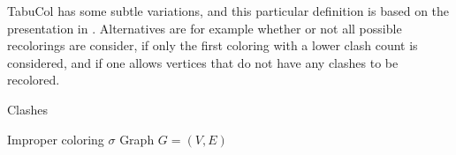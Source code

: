 \documentclass[a4paper]{article}
\begin{document}
TabuCol has some subtle variations, and this particular definition is based on
the presentation in \cite{Constructive}. Alternatives are for example whether or
not all possible recolorings are consider, if only the first coloring with a
lower clash count is considered, and if one allows vertices that do not have any
clashes to be recolored.

\begin{algorithm}[H]
    \caption{Clashes}
    \begin{algorithmic}[1]
        \REQUIRE Improper coloring $\sigma$
        \REQUIRE Graph $G = (V,E)$
    \end{algorithmic}
\end{algorithm}
\end{document}

